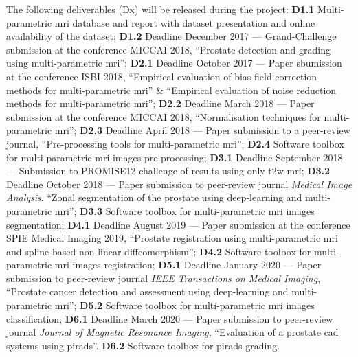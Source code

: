 The following deliverables (Dx) will be released during the project:
\textbf{D1.1} Multi-parametric \ac{mri} database and report with dataset presentation and online availability of the dataset;
\textbf{D1.2} Deadline December 2017 --- Grand-Challenge submission at the conference MICCAI 2018, ``Prostate detection and grading using multi-parametric \ac{mri}'';
\textbf{D2.1} Deadline October 2017 --- Paper sbumission at the conference ISBI 2018, ``Empirical evaluation of bias field correction methods for multi-parametric \ac{mri}'' \& ``Empirical evaluation of noise reduction methods for multi-parametric \ac{mri}'';
\textbf{D2.2} Deadline March 2018 --- Paper submission at the conference MICCAI 2018, ``Normalisation techniques for multi-parametric \ac{mri}'';
\textbf{D2.3} Deadline April 2018 --- Paper submission to a peer-review journal, ``Pre-processing tools for multi-parametric \ac{mri}'';
\textbf{D2.4} Software toolbox for multi-parametric \ac{mri} images pre-processing;
\textbf{D3.1} Deadline September 2018 --- Submission to PROMISE12 challenge of results using only \ac{t2w}-\ac{mri};
\textbf{D3.2} Deadline October 2018 --- Paper submission to peer-review journal \emph{Medical Image Analysis}, ``Zonal segmentation of the prostate using deep-learning and multi-parametric \ac{mri}'';
\textbf{D3.3} Software toolbox for multi-parametric \ac{mri} images segmentation;
\textbf{D4.1} Deadline August 2019 --- Paper submission at the conference SPIE Medical Imaging 2019, ``Prostate registration using multi-parametric \ac{mri} and spline-based non-linear diffeomorphism'';
\textbf{D4.2} Software toolbox for multi-parametric \ac{mri} images registration;
\textbf{D5.1} Deadline January 2020 --- Paper submission to peer-review journal \emph{IEEE Transactions on Medical Imaging}, ``Prostate cancer detection and assessment using deep-learning and multi-parametric \ac{mri}'';
\textbf{D5.2} Software toolbox for multi-parametric \ac{mri} images classification;
\textbf{D6.1} Deadline March 2020 --- Paper submission to peer-review journal \emph{Journal of Magnetic Resonance Imaging}, ``Evaluation of a prostate \ac{cad} systems using \ac{pirads}''.
\textbf{D6.2} Software toolbox for \ac{pirads} grading.

